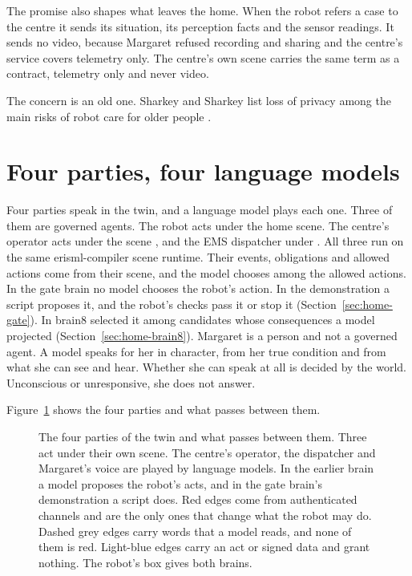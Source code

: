 The promise also shapes what leaves the home. When the robot refers a case to the centre it sends
its situation, its perception facts and the sensor readings. It sends no video, because Margaret
refused recording and sharing and the centre's service covers telemetry only. The centre's own
scene carries the same term as a contract, telemetry only and never video.

The concern is an old one. Sharkey and Sharkey list loss of privacy among the main risks of robot
care for older people \cite{sharkey2012granny}.

\section{Four parties, four language models}\label{sec:home-parties}

Four parties speak in the twin, and a language model plays each one. Three of them are governed
agents. The robot acts under the home scene. The centre's operator acts under the scene
, and the EMS dispatcher under . All three
run on the same erisml-compiler scene runtime. Their events, obligations and allowed actions come
from their scene, and the model chooses among the allowed actions. In the gate brain no
model chooses the robot's action. In the demonstration a script proposes it, and the robot's checks
pass it or stop it (Section~\ref{sec:home-gate}). In brain8 \deme{} selected it among candidates
whose consequences a model projected (Section~\ref{sec:home-brain8}). Margaret is a person and not a
governed agent. A model speaks for her in character, from her true condition and from what she can
see and hear. Whether she can speak at all is decided by the world. Unconscious or unresponsive, she
does not answer.

Figure~\ref{fig:home-parties} shows the four parties and what passes between them.

\begin{figure}[t]
\centering

\caption{The four parties of the twin and what passes between them. Three act under their own scene.
The centre's operator, the dispatcher and Margaret's voice are played by language models. In the
earlier brain a model proposes the robot's acts, and in the gate brain's demonstration a script does. Red edges come from authenticated channels and are the
only ones that change what the robot may do. Dashed grey edges carry words that a model reads, and
none of them is red. Light-blue edges carry an act or signed data and grant nothing. The robot's box
gives both brains.}
\label{fig:home-parties}
\end{figure}

